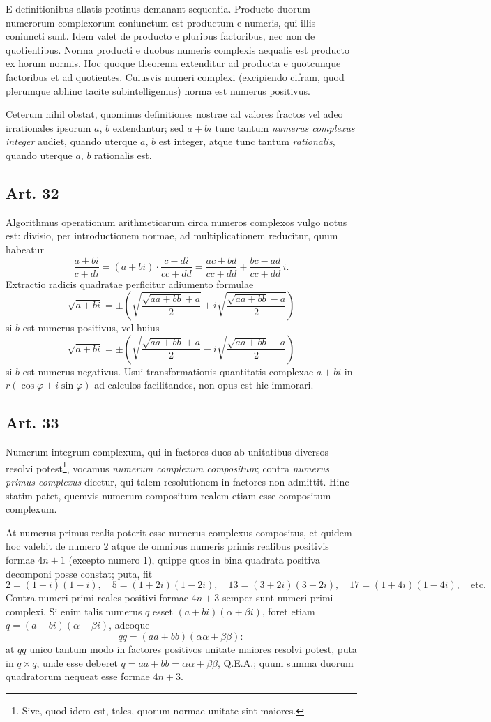 \documentclass[12pt]{article}
\newcommand{\art}[1]{\subsection*{Art. #1}}
\begin{document}
E definitionibus allatis protinus demanant sequentia. Producto duorum numerorum complexorum coniunctum est productum e numeris, qui illis coniuncti sunt. Idem valet de producto e pluribus factoribus, nec non de quotientibus. Norma producti e duobus numeris complexis aequalis est producto ex horum normis. Hoc quoque theorema extenditur ad producta e quotcunque factoribus et ad quotientes. Cuiusvis numeri complexi (excipiendo cifram, quod plerumque abhinc tacite subintelligemus) norma est numerus positivus.

Ceterum nihil obstat, quominus definitiones nostrae ad valores fractos vel adeo irrationales ipsorum $a$, $b$ extendantur; sed $a+bi$ tunc tantum \textit{numerus complexus integer} audiet, quando uterque $a$, $b$ est integer, atque tunc tantum \textit{rationalis}, quando uterque $a$, $b$ rationalis est.

\art{32}

Algorithmus operationum arithmeticarum circa numeros complexos vulgo notus est: divisio, per introductionem normae, ad multiplicationem reducitur, quum habeatur
\[
\frac{a+bi}{c+di}=(a+bi)\cdot\frac{c-di}{cc+dd}=\frac{ac+bd}{cc+dd}+\frac{bc-ad}{cc+dd}\,i.
\]
Extractio radicis quadratae perficitur adiumento formulae
\[
\sqrt{a+bi}=\pm\left(\sqrt{\frac{\sqrt{aa+bb}+a}{2}}+i\sqrt{\frac{\sqrt{aa+bb}-a}{2}}\right)
\]
si $b$ est numerus positivus, vel huius
\[
\sqrt{a+bi}=\pm\left(\sqrt{\frac{\sqrt{aa+bb}+a}{2}}-i\sqrt{\frac{\sqrt{aa+bb}-a}{2}}\right)
\]
si $b$ est numerus negativus. Usui transformationis quantitatis complexae $a+bi$ in $r(\cos \varphi+i\sin\varphi)$ ad calculos facilitandos, non opus est hic immorari.

\art{33}

Numerum integrum complexum, qui in factores duos ab unitatibus diversos resolvi potest\footnote{Sive, quod idem est, tales, quorum normae unitate sint maiores.}, vocamus \textit{numerum complexum compositum}; contra \textit{numerus primus complexus} dicetur, qui talem resolutionem in factores non admittit. Hinc statim patet, quemvis numerum compositum realem etiam esse compositum complexum.

At numerus primus realis poterit esse numerus complexus compositus, et quidem hoc valebit de numero $2$ atque de omnibus numeris primis realibus positivis formae $4n+1$ (excepto numero 1), quippe quos in bina quadrata positiva decomponi posse constat; puta, fit
\[
2=(1+i)(1-i),\quad 5=(1+2i)(1-2i),\quad 13=(3+2i)(3-2i),\quad 17=(1+4i)(1-4i),\quad \text{etc.}
\]
Contra numeri primi reales positivi formae $4n+3$ semper sunt numeri primi complexi. Si enim talis numerus $q$ esset $(a+bi)(\alpha+\beta i)$, foret etiam $q=(a-bi)(\alpha-\beta i)$, adeoque
\[
qq=(aa+bb)(\alpha\alpha+\beta\beta):
\]
at $qq$ unico tantum modo in factores positivos unitate maiores resolvi potest, puta in $q\times q$, unde esse deberet $q=aa+bb=\alpha\alpha+\beta\beta$, Q.E.A.; quum summa duorum quadratorum nequeat esse formae $4n+3$.
\end{document}
